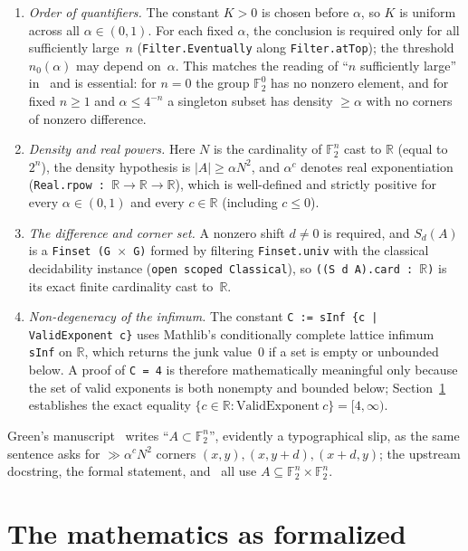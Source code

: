 \documentclass[11pt,reqno]{amsart}
\theoremstyle{remark}
\newcommand{\F}{\mathbb{F}}
\newcommand{\R}{\mathbb{R}}
\newcommand{\LeanUS}{\textunderscore\hspace{0pt}}
\newcommand{\lean}[1]{{\let\_\LeanUS\texttt{#1}}}
\begin{document}
\begin{enumerate}[label=(\alph*),leftmargin=2em]
\item \emph{Order of quantifiers.} The constant $K > 0$ is chosen before $\alpha$, so $K$ is uniform across all $\alpha \in (0, 1)$. For each fixed $\alpha$, the conclusion is required only for all sufficiently large~$n$ (\lean{Filter.\allowbreak{}Eventually} along \lean{Filter.\allowbreak{}atTop}); the threshold $n_0(\alpha)$ may depend on~$\alpha$. This matches the reading of ``$n$ sufficiently large'' in~\cite{Mandache,FSSSZ} and is essential: for $n = 0$ the group $\F_2^0$ has no nonzero element, and for fixed $n \ge 1$ and $\alpha \le 4^{-n}$ a singleton subset has density $\ge \alpha$ with no corners of nonzero difference.
\item \emph{Density and real powers.} Here $N$ is the cardinality of $\F_2^n$ cast to $\R$ (equal to $2^n$), the density hypothesis is $|A| \ge \alpha N^2$, and $\alpha^{c}$ denotes real exponentiation (\lean{Real.\allowbreak{}rpow : $\R \to \R \to \R$}), which is well-defined and strictly positive for every $\alpha \in (0, 1)$ and every $c \in \R$ (including $c \le 0$).
\item \emph{The difference and corner set.} A nonzero shift $d \neq 0$ is required, and $S_d(A)$ is a \lean{Finset (G $\times$ G)} formed by filtering \lean{Finset.\allowbreak{}univ} with the classical decidability instance (\lean{open scoped Classical}), so \lean{((S d A).card : $\R$)} is its exact finite cardinality cast to~$\R$.
\item \emph{Non-degeneracy of the infimum.} The constant \lean{C := sInf \{c | ValidExponent c\}} uses Mathlib's conditionally complete lattice infimum \lean{sInf} on $\R$, which returns the junk value~$0$ if a set is empty or unbounded below. A proof of \lean{C = 4} is therefore mathematically meaningful only because the set of valid exponents is both nonempty and bounded below; Section~\ref{sec:math} establishes the exact equality $\{c \in \R : \mathrm{ValidExponent}\ c\} = [4, \infty)$.
\end{enumerate}

Green's manuscript~\cite{Green} writes ``$A \subset \F_2^n$'', evidently a typographical slip, as the same sentence asks for $\gg \alpha^c N^2$ corners $(x, y), (x, y + d), (x + d, y)$; the upstream docstring, the formal statement, and~\cite{Mandache,FSSSZ} all use $A \subseteq \F_2^n \times \F_2^n$.

\section{The mathematics as formalized}\label{sec:math}
\end{document}

